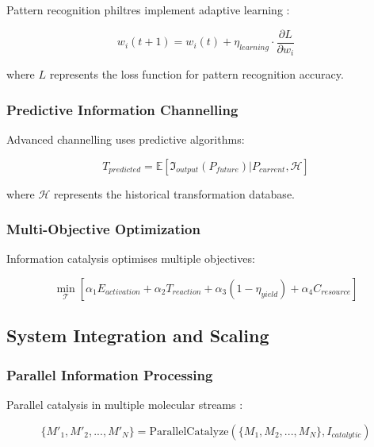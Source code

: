 \documentclass[12pt,a4paper]{article}
\begin{document}
Pattern recognition philtres implement adaptive learning \cite{bishop2006pattern}:

\begin{equation}
w_i(t+1) = w_i(t) + \eta_{learning} \cdot \frac{\partial L}{\partial w_i}
\end{equation}

where $L$ represents the loss function for pattern recognition accuracy.

\subsubsection{Predictive Information Channelling}

Advanced channelling uses predictive algorithms:

\begin{equation}
T_{predicted} = \mathbb{E}[\mathfrak{I}_{output}(P_{future}) | P_{current}, \mathcal{H}]
\end{equation}

where $\mathcal{H}$ represents the historical transformation database.

\subsubsection{Multi-Objective Optimization}

Information catalysis optimises multiple objectives:

\begin{equation}
\min_{\mathcal{T}} \left[ \alpha_1 E_{activation} + \alpha_2 T_{reaction} + \alpha_3 (1 - \eta_{yield}) + \alpha_4 C_{resource} \right]
\end{equation}

\subsection{System Integration and Scaling}

\subsubsection{Parallel Information Processing}

Parallel catalysis in multiple molecular streams \cite{kumar1994introduction}:

\begin{equation}
\{M'_1, M'_2, ..., M'_N\} = \text{ParallelCatalyze}(\{M_1, M_2, ..., M_N\}, I_{catalytic})
\end{equation}
\end{document}
